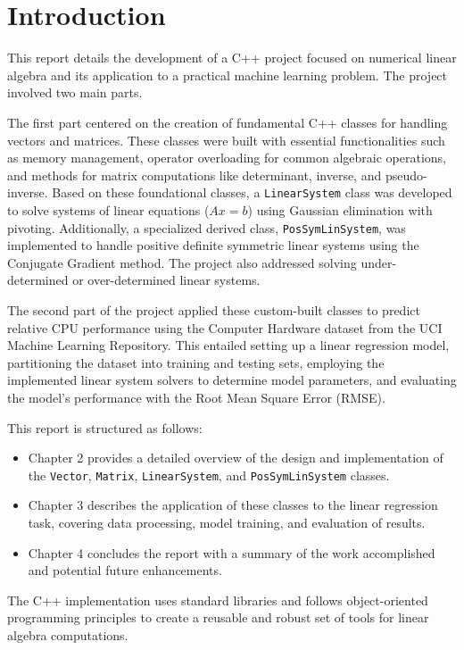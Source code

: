 \chapter{Introduction}
\label{chap:introduction}

This report details the development of a C++ project focused on numerical linear algebra and its application to a practical machine learning problem. The project involved two main parts.

The first part centered on the creation of fundamental C++ classes for handling vectors and matrices. These classes were built with essential functionalities such as memory management, operator overloading for common algebraic operations, and methods for matrix computations like determinant, inverse, and pseudo-inverse. Based on these foundational classes, a \texttt{LinearSystem} class was developed to solve systems of linear equations ($Ax=b$) using Gaussian elimination with pivoting. Additionally, a specialized derived class, \texttt{PosSymLinSystem}, was implemented to handle positive definite symmetric linear systems using the Conjugate Gradient method. The project also addressed solving under-determined or over-determined linear systems.

The second part of the project applied these custom-built classes to predict relative CPU performance using the Computer Hardware dataset from the UCI Machine Learning Repository. This entailed setting up a linear regression model, partitioning the dataset into training and testing sets, employing the implemented linear system solvers to determine model parameters, and evaluating the model's performance with the Root Mean Square Error (RMSE).

This report is structured as follows:
\begin{itemize}
    \item Chapter 2 provides a detailed overview of the design and implementation of the \texttt{Vector}, \texttt{Matrix}, \texttt{LinearSystem}, and \texttt{PosSymLinSystem} classes.
    \item Chapter 3 describes the application of these classes to the linear regression task, covering data processing, model training, and evaluation of results.
    \item Chapter 4 concludes the report with a summary of the work accomplished and potential future enhancements.
\end{itemize}

The C++ implementation uses standard libraries and follows object-oriented programming principles to create a reusable and robust set of tools for linear algebra computations.